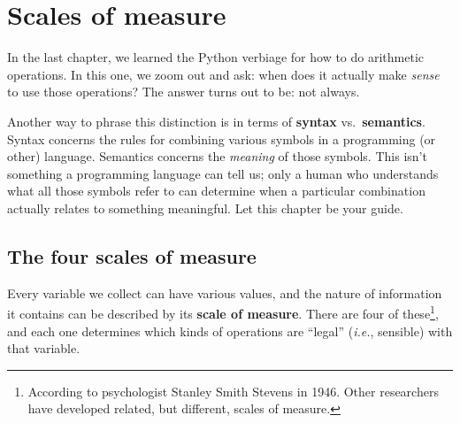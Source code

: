 
\chapter{Scales of measure}

In the last chapter, we learned the Python verbiage for how to do arithmetic
operations. In this one, we zoom out and ask: when does it actually make
\textit{sense} to use those operations? The answer turns out to be: not always.

Another way to phrase this distinction is in terms of \textbf{syntax}
vs.~\textbf{semantics}. Syntax concerns the rules for combining various symbols
in a programming (or other) language. Semantics concerns the \textit{meaning}
of those symbols. This isn't something a programming language can tell us; only
a human who understands what all those symbols refer to can determine when a
particular combination actually relates to something meaningful. Let this
chapter be your guide.

\section{The four scales of measure}

Every variable we collect can have various values, and the nature of
information it contains can be described by its \textbf{scale of measure}.
There are four of these\footnote{According to psychologist Stanley Smith
Stevens in 1946. Other researchers have developed related, but different,
scales of measure.}, and each one determines which kinds of operations are
``legal'' (\textit{i.e.}, sensible) with that variable.

